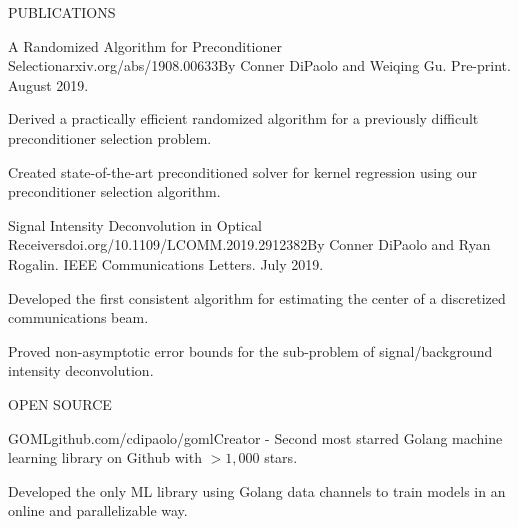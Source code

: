 \documentclass{resume} %
\begin{document}

\begin{rSection}{PUBLICATIONS}

\begin{rSubsection}{A Randomized Algorithm for Preconditioner Selection}{\textsf{arxiv.org/abs/1908.00633}}{By Conner DiPaolo and Weiqing Gu. Pre-print. August 2019.}

\item Derived a practically efficient randomized algorithm for a previously difficult preconditioner selection problem.
\item Created state-of-the-art preconditioned solver for kernel regression using our preconditioner selection algorithm.
\end{rSubsection}

\begin{rSubsection}{Signal Intensity Deconvolution in Optical Receivers}{\textsf{doi.org/10.1109/LCOMM.2019.2912382}}{By Conner DiPaolo and Ryan Rogalin. IEEE Communications Letters. July 2019.}

\item Developed the first consistent algorithm for estimating the center of a discretized communications beam.
\item Proved non-asymptotic error bounds for the sub-problem of signal/background intensity deconvolution.
\end{rSubsection}


\end{rSection}


\begin{rSection}{OPEN SOURCE}

\begin{rSubsection}{GOML}{\textsf{github.com/cdipaolo/goml}}{Creator - Second most starred Golang machine learning library on Github with $> 1,000$ stars.}

\item Developed the only ML library using Golang data channels to train models in an online and parallelizable way.
\end{rSubsection}

\end{rSection}
\end{document}
